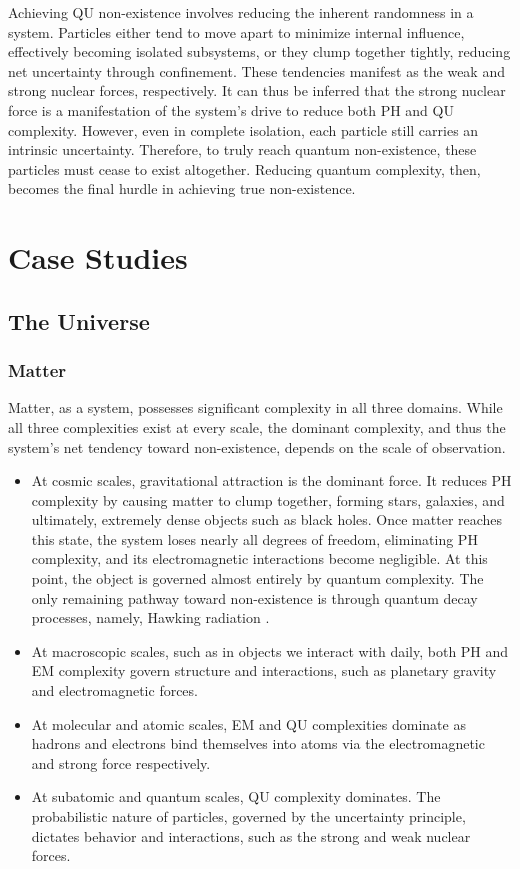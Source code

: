 \documentclass{article}
\begin{document}
Achieving QU non-existence involves reducing the inherent randomness in a system. Particles either tend to move apart to minimize internal influence, effectively becoming isolated subsystems, or they clump together tightly, reducing net uncertainty through confinement. These tendencies manifest as the weak and strong nuclear forces, respectively. It can thus be inferred that the strong nuclear force is a manifestation of the system’s drive to reduce both PH and QU complexity. However, even in complete isolation, each particle still carries an intrinsic uncertainty. Therefore, to truly reach quantum non-existence, these particles must cease to exist altogether. Reducing quantum complexity, then, becomes the final hurdle in achieving true non-existence.



\newpage
\section{Case Studies}


\subsection{The Universe}

\subsubsection{Matter}
Matter, as a system, possesses significant complexity in all three domains. While all three complexities exist at every scale, the dominant complexity, and thus the system’s net tendency toward non-existence, depends on the scale of observation.
\begin{itemize}
    \item At cosmic scales, gravitational attraction is the dominant force. It reduces PH complexity by causing matter to clump together, forming stars, galaxies, and ultimately, extremely dense objects such as black holes. Once matter reaches this state, the system loses nearly all degrees of freedom, eliminating PH complexity, and its electromagnetic interactions become negligible. At this point, the object is governed almost entirely by quantum complexity. The only remaining pathway toward non-existence is through quantum decay processes, namely, Hawking radiation \cite{hawking1975}.
    \item At macroscopic scales, such as in objects we interact with daily, both PH and EM complexity govern structure and interactions, such as planetary gravity and electromagnetic forces.
    \item At molecular and atomic scales, EM and QU complexities dominate as hadrons and electrons bind themselves into atoms via the electromagnetic and strong force respectively.
    \item At subatomic and quantum scales, QU complexity dominates. The probabilistic nature of particles, governed by the uncertainty principle, dictates behavior and interactions, such as the strong and weak nuclear forces.
\end{itemize}
\end{document}
